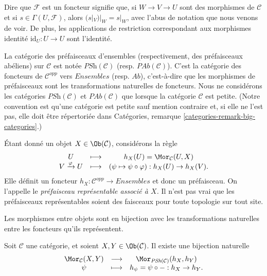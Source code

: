 \medskip\noindent
Dire que $\mathcal{F}$ est un foncteur signifie que, si
$W \to V \to U$ sont des morphismes de $\mathcal{C}$ et si
$s \in \Gamma(U, \mathcal{F})$, alors
$(s|_V)|_W = s |_W$, avec l'abus de
notation que nous venons de voir. De plus, les applications de restriction correspondant aux
morphismes identit\'e $\text{id}_U : U \to U$ sont l'identit\'e.

\medskip\noindent
La cat\'egorie des pr\'efaisceaux d'ensembles (respectivement, des pr\'efaisceaux ab\'eliens) sur
$\mathcal{C}$ est not\'ee $\textit{PSh} (\mathcal{C})$ (resp. $\textit{PAb}
(\mathcal{C})$). C'est la cat\'egorie des foncteurs de $\mathcal{C}^{opp}$ vers
$\textit{Ensembles}$ (resp. $\textit{Ab}$), c'est-\`a-dire que les morphismes de
pr\'efaisceaux sont les transformations naturelles de foncteurs. Nous ne consid\'erons les
cat\'egories $\textit{PSh}(\mathcal{C})$ et $\textit{PAb}(\mathcal{C})$
que lorsque la cat\'egorie $\mathcal{C}$ est petite. (Notre convention est qu'une cat\'egorie
est petite sauf mention contraire et, si elle ne l'est pas, elle doit \^etre
r\'epertori\'ee dans Cat\'egories, remarque \ref{categories-remark-big-categories}.)

\begin{example}
\label{example-representable-presheaf}
\'Etant donn\'e un objet $X \in \Ob(\mathcal{C})$, consid\'erons la r\`egle
$$
\begin{matrix}
U & \longmapsto & h_X(U) = \Mor_\mathcal{C}(U, X) \\
V \xrightarrow{\varphi} U & \longmapsto &
(\psi \mapsto \psi \circ \varphi) : h_X(U) \to h_X(V).
\end{matrix}
$$
Elle d\'efinit un foncteur $h_X : \mathcal{C}^{opp} \to \textit{Ensembles}$
et donc un pr\'efaisceau. On l'appelle le
{\it pr\'efaisceau repr\'esentable associ\'e \`a $X$.}
Il n'est pas vrai que les pr\'efaisceaux repr\'esentables soient des faisceaux pour toute topologie sur
tout site.
\end{example}

\begin{lemma}[Yoneda]
\label{lemma-yoneda}
\begin{slogan}
Les morphismes entre objets sont en bijection avec les transformations naturelles
entre les foncteurs qu'ils repr\'esentent.
\end{slogan}
Soit $\mathcal{C}$ une cat\'egorie, et soient $X, Y \in
\Ob(\mathcal{C})$. Il existe une bijection naturelle
$$
\begin{matrix}
\Mor_\mathcal{C}(X, Y) &
\longrightarrow &
\Mor_{\textit{PSh}(\mathcal{C})} (h_X, h_Y) \\
\psi &
\longmapsto &
h_\psi = \psi \circ - : h_X \to h_Y.
\end{matrix}
$$
\end{lemma}

